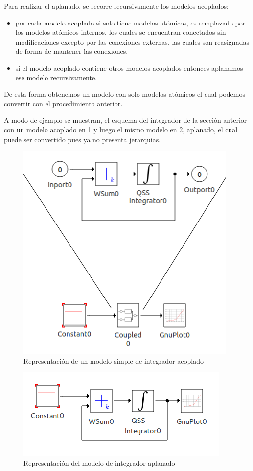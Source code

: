 \documentclass[a4paper,	11pt]{report}
\begin{document}
Para realizar el aplanado, se recorre recursivamente los modelos acoplados:

\begin{itemize}
\item por cada modelo acoplado si solo tiene modelos atómicos, es remplazado por los modelos atómicos internos, los cuales se encuentran conectados sin modificaciones excepto por las conexiones externas, las cuales son reasignadas de forma de mantener las conexiones.
\item si el modelo acoplado contiene otros modelos acoplados entonces aplanamos ese modelo recursivamente.
\end{itemize} 

De esta forma obtenemos un modelo con solo modelos atómicos el cual podemos convertir con el procedimiento anterior.

A modo de ejemplo se muestran, el esquema del integrador de la sección anterior con un modelo acoplado en \ref{fig:acomplado} y luego el mismo modelo en \ref{fig:aplanado}, aplanado, el cual puede ser convertido pues ya no presenta jerarquias.

\begin{figure}[H]
\centering
 \includegraphics[width=0.5\linewidth]{integrator-sample}
 \caption{Representación de un modelo simple de integrador acoplado}
 \label{fig:acomplado}
\end{figure}


\begin{figure}[H]
\centering
 \includegraphics[width=0.5\linewidth]{integrator-expanded}
 \caption{Representación del modelo de integrador aplanado }
 \label{fig:aplanado}
\end{figure}
\end{document}
